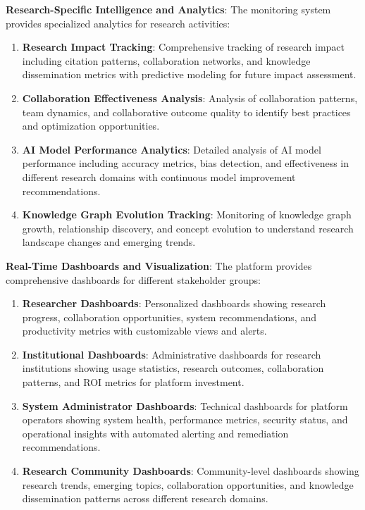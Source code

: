 \documentclass[10pt,twocolumn]{article}
\begin{document}
\textbf{Research-Specific Intelligence and Analytics}: The monitoring system provides specialized analytics for research activities:

\begin{enumerate}
    \item \textbf{Research Impact Tracking}: Comprehensive tracking of research impact including citation patterns, collaboration networks, and knowledge dissemination metrics with predictive modeling for future impact assessment.
    
    \item \textbf{Collaboration Effectiveness Analysis}: Analysis of collaboration patterns, team dynamics, and collaborative outcome quality to identify best practices and optimization opportunities.
    
    \item \textbf{AI Model Performance Analytics}: Detailed analysis of AI model performance including accuracy metrics, bias detection, and effectiveness in different research domains with continuous model improvement recommendations.
    
    \item \textbf{Knowledge Graph Evolution Tracking}: Monitoring of knowledge graph growth, relationship discovery, and concept evolution to understand research landscape changes and emerging trends.
\end{enumerate}

\textbf{Real-Time Dashboards and Visualization}: The platform provides comprehensive dashboards for different stakeholder groups:

\begin{enumerate}
    \item \textbf{Researcher Dashboards}: Personalized dashboards showing research progress, collaboration opportunities, system recommendations, and productivity metrics with customizable views and alerts.
    
    \item \textbf{Institutional Dashboards}: Administrative dashboards for research institutions showing usage statistics, research outcomes, collaboration patterns, and ROI metrics for platform investment.
    
    \item \textbf{System Administrator Dashboards}: Technical dashboards for platform operators showing system health, performance metrics, security status, and operational insights with automated alerting and remediation recommendations.
    
    \item \textbf{Research Community Dashboards}: Community-level dashboards showing research trends, emerging topics, collaboration opportunities, and knowledge dissemination patterns across different research domains.
\end{enumerate}
\end{document}
